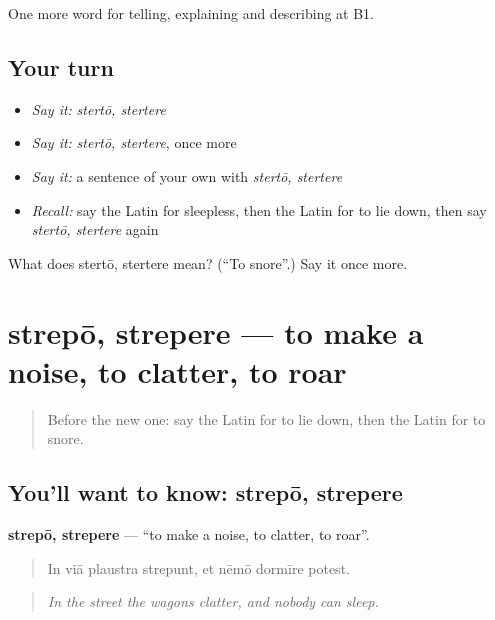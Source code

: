 \begin{grammarlens}[title={What you've built}]
One more word for telling, explaining and describing at B1.
\end{grammarlens}

\subsection*{Your turn}
\begin{itemize}
\raggedright
  \item \emph{Say it:} \emph{stertō, stertere}
  \item \emph{Say it:} \emph{stertō, stertere}, once more
  \item \emph{Say it:} a sentence of your own with \emph{stertō, stertere}
  \item \emph{Recall:} say the Latin for sleepless, then the Latin for to lie down, then say \emph{stertō, stertere} again
\end{itemize}

\begin{tcolorbox}[breakable,colback=teal!4,colframe=teal!35!black,title={Before you move on}]
What does stertō, stertere mean? (\textquotedblleft{}To snore\textquotedblright{}.) Say it once more.
\end{tcolorbox}
\section[strepō, strepere]{strepō, strepere — to make a noise, to clatter, to roar}

\label{lesson:LA-C448-strepo}



\begin{quote}
Before the new one: say the Latin for to lie down, then the Latin for to snore.
\end{quote}

\subsection*{You'll want to know: strepō, strepere}
\textbf{strepō, strepere} — \textquotedblleft{}to make a noise, to clatter, to roar\textquotedblright{}.

\begin{quote}
In viā plaustra strepunt, et nēmō dormīre potest.
\end{quote}

\begin{quote}
\emph{In the street the wagons clatter, and nobody can sleep.}
\end{quote}

